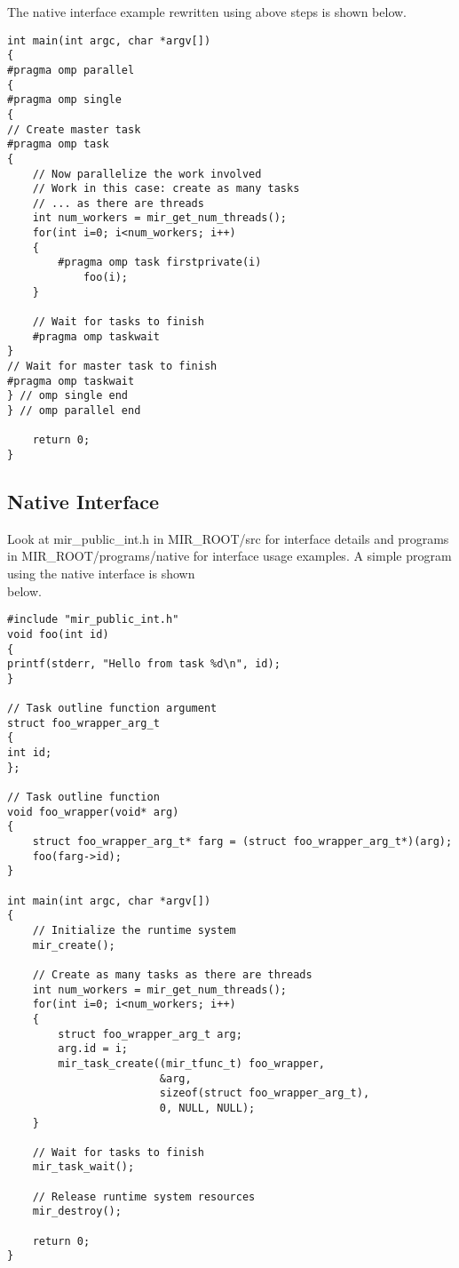 \documentclass[11pt,a4paper]{article}
\begin{document}
The native interface example rewritten using above steps is shown below.

\begin{lstlisting}[style=MyCStyle]
int main(int argc, char *argv[])
{
#pragma omp parallel
{
#pragma omp single
{
// Create master task
#pragma omp task
{
    // Now parallelize the work involved
    // Work in this case: create as many tasks 
    // ... as there are threads
    int num_workers = mir_get_num_threads();
    for(int i=0; i<num_workers; i++)
    {
        #pragma omp task firstprivate(i)
            foo(i);
    }
        
    // Wait for tasks to finish
    #pragma omp taskwait
}
// Wait for master task to finish
#pragma omp taskwait
} // omp single end
} // omp parallel end

    return 0;
}
\end{lstlisting}

\subsection{Native Interface}\label{native-interface}

Look at mir\_public\_int.h in MIR\_ROOT/src for interface details and programs in MIR\_ROOT/programs/native for interface usage examples. A simple program using the native interface is shown\\below.  

\begin{lstlisting}[style=MyCStyle]
#include "mir_public_int.h"
void foo(int id)
{
printf(stderr, "Hello from task %d\n", id);
}

// Task outline function argument
struct foo_wrapper_arg_t
{
int id;
};

// Task outline function
void foo_wrapper(void* arg)
{
    struct foo_wrapper_arg_t* farg = (struct foo_wrapper_arg_t*)(arg);
    foo(farg->id);
}

int main(int argc, char *argv[])
{
    // Initialize the runtime system
    mir_create();

    // Create as many tasks as there are threads
    int num_workers = mir_get_num_threads();
    for(int i=0; i<num_workers; i++)
    {
        struct foo_wrapper_arg_t arg;
        arg.id = i;
        mir_task_create((mir_tfunc_t) foo_wrapper, 
                        &arg, 
                        sizeof(struct foo_wrapper_arg_t), 
                        0, NULL, NULL);
    }
        
    // Wait for tasks to finish
    mir_task_wait();

    // Release runtime system resources
    mir_destroy();

    return 0;
}
\end{lstlisting}
\end{document}
